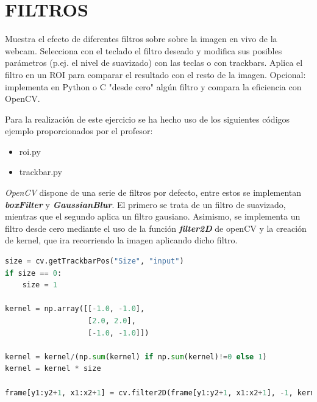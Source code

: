 \documentclass[a4paper]{article} %
\renewcommand{\baselinestretch}{1.5}
\begin{document}
\newpage


\section{FILTROS}
\bigskip

\begin{tcolorbox}[breakable,notitle,boxrule=0pt,colback=lightgray,colframe=lightgray]
Muestra el efecto de diferentes filtros sobre sobre la imagen en vivo de la webcam. Selecciona con el teclado el filtro deseado y modifica sus posibles parámetros (p.ej. el nivel de suavizado) con las teclas o con trackbars. Aplica el filtro en un ROI para comparar el resultado con el resto de la imagen. Opcional: implementa en Python o C "desde cero" algún filtro y compara la eficiencia con OpenCV.
\end{tcolorbox}

Para la realización de este ejercicio se ha hecho uso de los siguientes códigos ejemplo proporcionados por el profesor:

\begin{itemize}
  \item roi.py
  \item trackbar.py
\end{itemize}

\textit{OpenCV} dispone de una serie de filtros por defecto, entre estos se implementan \textbf{\textit{boxFilter}} y \textbf{\textit{GaussianBlur}}. El primero se trata de un filtro de suavizado, mientras que el segundo aplica un filtro gausiano.
Asimismo, se implementa un filtro desde cero mediante el uso de la función \textbf{\textit{filter2D}} de openCV y la creación de kernel, que ira recorriendo la imagen aplicando dicho filtro.
\\
\renewcommand{\baselinestretch}{1}
\begin{tcolorbox}[]
\begin{lstlisting}[language=Python]
size = cv.getTrackbarPos("Size", "input")
if size == 0:
    size = 1
            
kernel = np.array([[-1.0, -1.0], 
                   [2.0, 2.0],
                   [-1.0, -1.0]])

kernel = kernel/(np.sum(kernel) if np.sum(kernel)!=0 else 1)
kernel = kernel * size

frame[y1:y2+1, x1:x2+1] = cv.filter2D(frame[y1:y2+1, x1:x2+1], -1, kernel)
\end{lstlisting}
\end{tcolorbox}
\renewcommand{\baselinestretch}{1.5}
\end{document}
